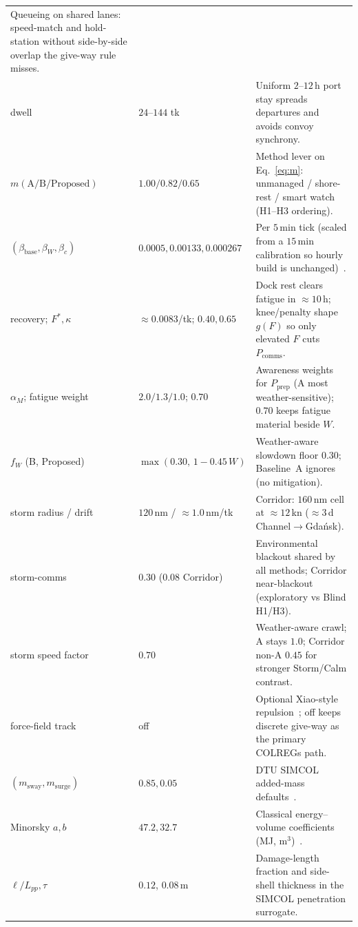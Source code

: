 \documentclass[cameraready]{Interspeech}
\begin{document}
\begin{table}[t]
\begin{tabular}{@{}llp{}@{}}
        Queueing on shared lanes: speed-match and hold-station without side-by-side overlap the give-way rule misses. \\
        dwell & $24$--$144$ tk &
        Uniform $2$--$12$\,h port stay spreads departures and avoids convoy synchrony. \\
        $m(\text{A/B/Proposed})$ & $1.00/0.82/0.65$ &
        Method lever on Eq.~\ref{eq:m}: unmanaged / shore-rest / smart watch (H1--H3 ordering). \\
        $(\beta_{\text{base}},\beta_W,\beta_c)$ & $0.0005,0.00133,0.000267$ &
        Per $5$\,min tick (scaled from a $15$\,min calibration so hourly build is unchanged)~\cite{chauvin2013}. \\
        recovery; $F^\ast,\kappa$ & ${\approx}0.0083$/tk; $0.40,0.65$ &
        Dock rest clears fatigue in ${\approx}10$\,h; knee/penalty shape $g(F)$ so only elevated $F$ cuts $P_{\text{comms}}$. \\
        $\alpha_M$; fatigue weight & $2.0/1.3/1.0$; $0.70$ &
        Awareness weights for $P_{\text{prep}}$ (A most weather-sensitive); $0.70$ keeps fatigue material beside $W$. \\
        $f_W$ (B, Proposed) & $\max(0.30,\,1-0.45\,W)$ &
        Weather-aware slowdown floor $0.30$; Baseline~A ignores (no mitigation). \\
        storm radius / drift & $120$\,nm / ${\approx}1.0$\,nm/tk &
        Corridor: $160$\,nm cell at ${\approx}12$\,kn (${\approx}3$\,d Channel$\to$Gda\'nsk). \\
        storm-comms & $0.30$ ($0.08$ Corridor) &
        Environmental blackout shared by all methods; Corridor near-blackout (exploratory vs Blind H1/H3). \\
        storm speed factor & $0.70$ &
        Weather-aware crawl; A stays $1.0$; Corridor non-A $0.45$ for stronger Storm/Calm contrast. \\
        force-field track & off &
        Optional Xiao-style repulsion~\cite{xiao2013}; off keeps discrete give-way as the primary COLREGs path. \\
        $(m_{\text{sway}},m_{\text{surge}})$ & $0.85,0.05$ &
        DTU SIMCOL added-mass defaults~\cite{lutzen2001}. \\
        Minorsky $a,b$ & $47.2,32.7$ &
        Classical energy--volume coefficients (MJ, m$^3$)~\cite{minorsky1959}. \\
        $\ell/L_{pp},\tau$ & $0.12$, $0.08$\,m &
        Damage-length fraction and side-shell thickness in the SIMCOL penetration surrogate. \\

\end{tabular}
\end{table}
\end{document}
